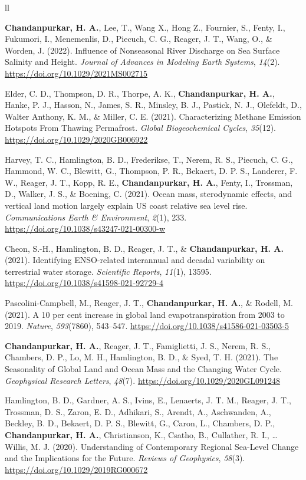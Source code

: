 ll\documentclass[10pt]{article}
\begin{document}
\label{csl:0}\textbf{Chandanpurkar, H. A.}, Lee, T., Wang X., Hong Z., Fournier, S., Fenty, I., Fukumori, I., Menemenlis, D., Piecuch, C. G., Reager, J. T., Wang, O., \& Worden, J. (2022). {Influence of Nonseasonal River Discharge on Sea Surface Salinity and Height}. \textit{Journal of Advances in Modeling Earth Systems}, \textit{14}(2). \url{https://doi.org/10.1029/2021MS002715}

\label{csl:0}Elder, C. D., Thompson, D. R., Thorpe, A. K., \textbf{Chandanpurkar, H. A.}, Hanke, P. J., Hasson, N., James, S. R., Minsley, B. J., Pastick, N. J., Olefeldt, D., Walter Anthony, K. M., \& Miller, C. E. (2021). {Characterizing Methane Emission Hotspots From Thawing Permafrost}. \textit{Global Biogeochemical Cycles}, \textit{35}(12). \url{https://doi.org/10.1029/2020GB006922}

\label{csl:0}Harvey, T. C., Hamlington, B. D., Frederikse, T., Nerem, R. S., Piecuch, C. G., Hammond, W. C., Blewitt, G., Thompson, P. R., Bekaert, D. P. S., Landerer, F. W., Reager, J. T., Kopp, R. E., \textbf{Chandanpurkar, H. A.}, Fenty, I., Trossman, D., Walker, J. S., \& Boening, C. (2021). {Ocean mass, sterodynamic effects, and vertical land motion largely explain US coast relative sea level rise}. \textit{Communications Earth \& Environment}, \textit{2}(1), 233. \url{https://doi.org/10.1038/s43247-021-00300-w}

\label{csl:0}Cheon, S.-H., Hamlington, B. D., Reager, J. T., \& \textbf{Chandanpurkar, H. A. }(2021). {Identifying ENSO-related interannual and decadal variability on terrestrial water storage}. \textit{Scientific Reports}, \textit{11}(1), 13595. \url{https://doi.org/10.1038/s41598-021-92729-4}

\label{csl:0}Pascolini-Campbell, M., Reager, J. T., \textbf{Chandanpurkar, H. A.}, \& Rodell, M. (2021). {A 10 per cent increase in global land evapotranspiration from 2003 to 2019}. \textit{Nature}, \textit{593}(7860), 543–547. \url{https://doi.org/10.1038/s41586-021-03503-5}

\label{csl:0}\textbf{Chandanpurkar, H. A.}, Reager, J. T., Famiglietti, J. S., Nerem, R. S., Chambers, D. P., Lo, M. H., Hamlington, B. D., \& Syed, T. H. (2021). {The Seasonality of Global Land and Ocean Mass and the Changing Water Cycle}. \textit{Geophysical Research Letters}, \textit{48}(7). \url{https://doi.org/10.1029/2020GL091248}

\label{csl:0}Hamlington, B. D., Gardner, A. S., Ivins, E., Lenaerts, J. T. M., Reager, J. T., Trossman, D. S., Zaron, E. D., Adhikari, S., Arendt, A., Aschwanden, A., Beckley, B. D., Bekaert, D. P. S., Blewitt, G., Caron, L., Chambers, D. P.,\textbf{ Chandanpurkar, H. A.}, Christianson, K., Csatho, B., Cullather, R. I., … Willis, M. J. (2020). {Understanding of Contemporary Regional Sea-Level Change and the Implications for the Future}. \textit{Reviews of Geophysics}, \textit{58}(3). \url{https://doi.org/10.1029/2019RG000672}
\end{document}
